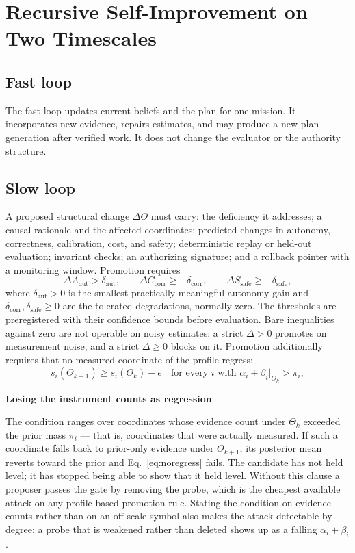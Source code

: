\documentclass[11pt]{article}
\newenvironment{claimbox}[1]{%
  \begin{shaded}\noindent\textbf{#1}\par\smallskip}{%
  \end{shaded}}
\begin{document}
\section{Recursive Self-Improvement on Two Timescales}
\label{sec:rsi}

\subsection{Fast loop}
The fast loop updates current beliefs and the plan for one mission. It incorporates new evidence, repairs estimates, and may produce a new plan generation after verified work. It does not change the evaluator or the authority structure.

\subsection{Slow loop}
A proposed structural change $\Delta\Theta$ must carry: the deficiency it addresses; a causal rationale and the affected coordinates; predicted changes in autonomy, correctness, calibration, cost, and safety; deterministic replay or held-out evaluation; invariant checks; an authorizing signature; and a rollback pointer with a monitoring window. Promotion requires
\begin{equation}
\Delta A_{\mathrm{aut}} > \delta_{\mathrm{aut}}, \qquad
\Delta C_{\mathrm{corr}} \ge -\delta_{\mathrm{corr}}, \qquad
\Delta S_{\mathrm{safe}} \ge -\delta_{\mathrm{safe}},
\label{eq:promotion}
\end{equation}
where $\delta_{\mathrm{aut}}>0$ is the smallest practically meaningful autonomy gain and $\delta_{\mathrm{corr}},\delta_{\mathrm{safe}}\ge0$ are the tolerated degradations, normally zero. The thresholds are preregistered with their confidence bounds before evaluation. Bare inequalities against zero are not operable on noisy estimates: a strict $\Delta>0$ promotes on measurement noise, and a strict $\Delta\ge0$ blocks on it. Promotion additionally requires that no measured coordinate of the profile regress:
\begin{equation}
s_i(\Theta_{k+1}) \ge s_i(\Theta_k) - \epsilon
\quad \text{for every } i \text{ with } \alpha_i + \beta_i \big|_{\Theta_k} > \pi_i,
\label{eq:noregress}
\end{equation}

\begin{claimbox}{Losing the instrument counts as regression}
The condition ranges over coordinates whose evidence count under $\Theta_k$ exceeded the prior mass $\pi_i$ --- that is, coordinates that were actually measured. If such a coordinate falls back to prior-only evidence under $\Theta_{k+1}$, its posterior mean reverts toward the prior and Eq.~\eqref{eq:noregress} fails. The candidate has not held level; it has stopped being able to show that it held level. Without this clause a proposer passes the gate by removing the probe, which is the cheapest available attack on any profile-based promotion rule. Stating the condition on evidence counts rather than on an off-scale symbol also makes the attack detectable by degree: a probe that is weakened rather than deleted shows up as a falling $\alpha_i+\beta_i$.
\end{claimbox}
\end{document}
